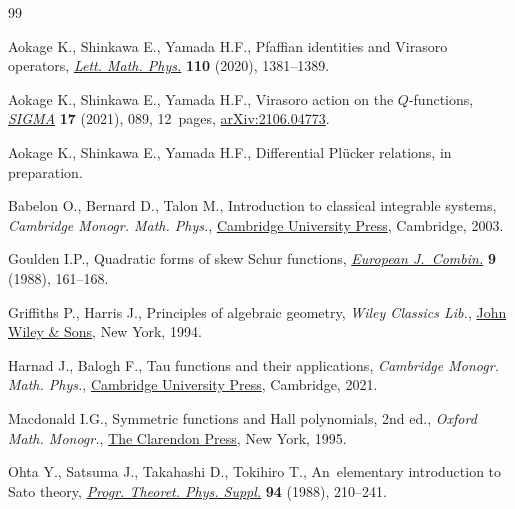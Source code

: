 \begin{thebibliography}{99}
\footnotesize\itemsep=0pt

Aokage K., Shinkawa E., Yamada H.F., Pfaffian identities and {V}irasoro
 operators, \href{https://doi.org/10.1007/s11005-020-01265-1}{\textit{Lett.
 Math. Phys.}} \textbf{110} (2020), 1381--1389.

Aokage K., Shinkawa E., Yamada H.F., Virasoro action on the {$Q$}-functions,
 \href{https://doi.org/10.3842/SIGMA.2021.089}{\textit{SIGMA}} \textbf{17}
 (2021), 089, 12~pages,
 \href{http://arxiv.org/abs/2106.04773}{arXiv:2106.04773}.

Aokage K., Shinkawa E., Yamada H.F., Differential {P}l\"ucker relations, {i}n
 preparation.

Babelon O., Bernard D., Talon M., Introduction to classical integrable systems,
 \textit{Cambridge Monogr. Math. Phys.},
 \href{https://doi.org/10.1017/CBO9780511535024}{Cambridge University Press},
 Cambridge, 2003.

Goulden I.P., Quadratic forms of skew {S}chur functions,
 \href{https://doi.org/10.1016/S0195-6698(88)80041-6}{\textit{European
 J.~Combin.}} \textbf{9} (1988), 161--168.

Griffiths P., Harris J., Principles of algebraic geometry, \textit{Wiley Classics Lib.},
 \href{https://doi.org/10.1002/9781118032527}{John Wiley \& Sons}, New
 York, 1994.

Harnad J., Balogh F., Tau functions and their applications, \textit{Cambridge Monogr.
 Math. Phys.}, \href{https://doi.org/10.1017/9781108610902}{Cambridge University Press}, Cambridge, 2021.

Macdonald I.G., Symmetric functions and {H}all polynomials, 2nd ed., \textit{Oxford Math. Monogr.}, \href{https://doi.org/10.1093/oso/9780198534891.001.0001}{The Clarendon Press}, New York, 1995.

Ohta Y., Satsuma J., Takahashi D., Tokihiro T., An~elementary introduction to
 {S}ato theory, \href{https://doi.org/10.1143/PTPS.94.210}{\textit{Progr.
 Theoret. Phys. Suppl.}} \textbf{94} (1988), 210--241.

\end{thebibliography}
